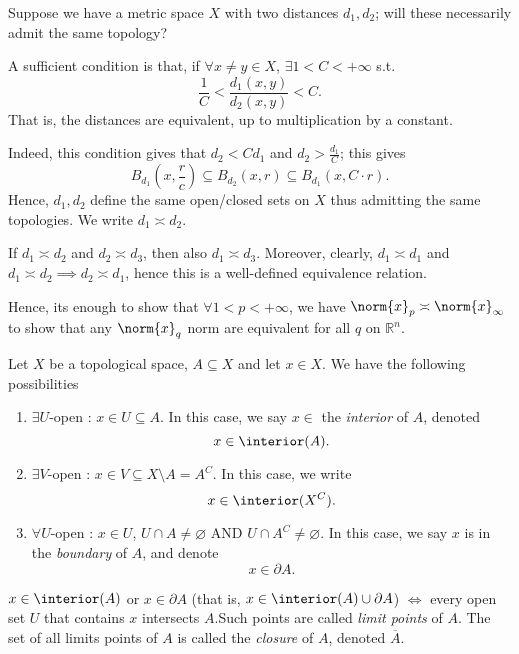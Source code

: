 \begin{definition}
    Suppose we have a metric space $X$ with two distances $d_1, d_2$; will these necessarily admit the same topology?

     A sufficient condition is that, if $\forall x \neq y \in X$, $\exists 1 < C < +\infty$ s.t. $$\frac{1}{C} < \frac{d_1(x, y)}{d_2(x,y)} < C.$$ That is, the distances are equivalent, up to multiplication by a constant.

    Indeed, this condition gives that $d_2 < C d_1$ and $d_2 > \frac{d_1}{C}$; this gives $$B_{d_1}(x, \frac{r}{c}) \subseteq B_{d_2}(x, r) \subseteq B_{d_1}(x, C \cdot r).$$ Hence, $d_1, d_2$ define the same open/closed sets on $X$ thus admitting the same topologies. We write $d_1 \asymp d_2$.
\end{definition}

\begin{remark}
    If $d_1 \asymp d_2$ and $d_2\asymp d_3$, then also $d_1 \asymp d_3$. Moreover, clearly, $d_1 \asymp d_1$ and $d_1 \asymp d_2 \implies d_2 \asymp d_1$, hence this is a well-defined equivalence relation.

    Hence, its enough to show that $\forall 1 < p < +\infty$, we have $\norm{x}_p \asymp \norm{x}_\infty$ to show that any $\norm{x}_q$ norm are equivalent for all $q$ on $\mathbb{R}^n$.
\end{remark}

\begin{definition}
Let $X$ be a topological space, $A \subseteq X$ and let $x \in X$. We have the following possibilities
\begin{enumerate}
    \item $\exists U$-open : $x \in U \subseteq A$. In this case, we say $x \in $ the \emph{interior} of $A$, denoted \[
    x \in \interior (A).
    \]
    \item $\exists V$-open : $x \in V \subseteq X\setminus A = A^C$. In this case, we write \[
    x \in \interior (X^C).    
    \]
    \item $\forall U$-open : $x \in U$, $U \cap A \neq \varnothing$ AND $U \cap A^C \neq \varnothing$. In this case, we say $x$ is in the \emph{boundary} of $A$, and denote \[
    x \in \partial A.    
    \]
\end{enumerate}
\end{definition}

\begin{definition}[Closure]
    $x \in \interior (A)$ or $x \in \partial A$ (that is, $x \in \interior (A) \cup \partial A$) $\iff $ every open set $U$ that contains $x$ intersects $A$.\footnotemark Such points are called \emph{limit points} of $A$. The set of all limits points of $A$ is called the \emph{closure} of $A$, denoted \(
    \overline{A}.
    \)
\end{definition}

